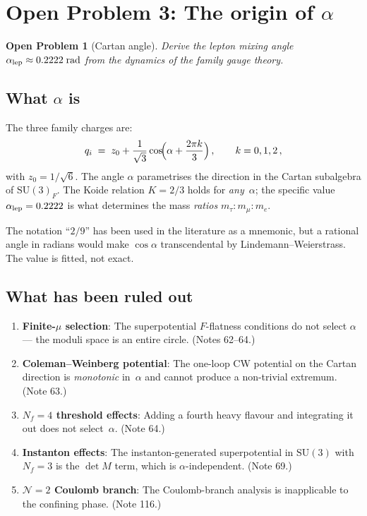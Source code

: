 \documentclass[12pt,a4paper]{article}
\newcommand{\SU}{\mathrm{SU}}
\newtheorem{problem}{Open Problem}
\begin{document}
\section{Open Problem 3: The origin of $\alpha$}
\label{sec:alpha}

\begin{problem}[Cartan angle]
Derive the lepton mixing angle $\alpha_{\rm lep} \approx 0.2222\;\mathrm{rad}$
from the dynamics of the family gauge theory.
\end{problem}

\subsection{What $\alpha$ is}

The three family charges are:
\begin{equation}
  q_i \;=\; z_0 + \frac{1}{\sqrt{3}}\cos\!\Bigl(\alpha + \frac{2\pi k}{3}\Bigr)\,,
  \qquad k = 0, 1, 2\,,
\end{equation}
with $z_0 = 1/\sqrt{6}$.  The angle $\alpha$ parametrises the direction in
the Cartan subalgebra of $\SU(3)_F$.  The Koide relation $K = 2/3$ holds
for \emph{any}~$\alpha$; the specific value $\alpha_{\rm lep} = 0.2222$
is what determines the mass \emph{ratios} $m_\tau : m_\mu : m_e$.

The notation ``$2/9$'' has been used in the literature as a mnemonic, but
a rational angle in radians would make $\cos\alpha$ transcendental by
Lindemann--Weierstrass.  The value is fitted, not exact.

\subsection{What has been ruled out}

\begin{enumerate}
\item \textbf{Finite-$\mu$ selection}: The superpotential $F$-flatness
  conditions do not select $\alpha$ --- the moduli space is an entire
  circle.  (Notes 62--64.)

\item \textbf{Coleman--Weinberg potential}: The one-loop CW potential on
  the Cartan direction is \emph{monotonic} in~$\alpha$ and cannot produce
  a non-trivial extremum.  (Note 63.)

\item \textbf{$N_f = 4$ threshold effects}: Adding a fourth heavy
  flavour and integrating it out does not select~$\alpha$.  (Note 64.)

\item \textbf{Instanton effects}: The instanton-generated superpotential
  in $\SU(3)$ with $N_f = 3$ is the $\det M$ term, which is
  $\alpha$-independent.  (Note 69.)

\item \textbf{$\mathcal{N}{=}2$ Coulomb branch}: The Coulomb-branch
  analysis is inapplicable to the confining phase.  (Note 116.)
\end{enumerate}
\end{document}
